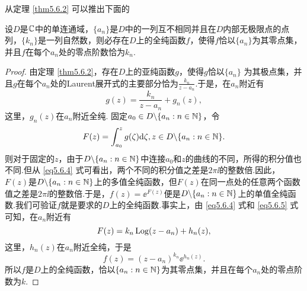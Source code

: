 从定理 \ref{thm5.6.2} 可以推出下面的
\begin{theorem}\label{thm5.6.3}
设$D$是$\mathbb C$中的单连通域，$\{a_n\}$是$D$中的一列互不相同并且在$D$内部无极限点的点列，$\{k_n\}$是一列自然数，则必存在$D$上的全纯函数$f$，使得$f$恰以$\{a_n\}$为其零点集，并且$f$在每个$a_n$处的零点阶数恰为$k_n$.
\end{theorem}
\begin{proof}
由定理 \ref{thm5.6.2}，存在$D$上的亚纯函数$g$，使得$g$恰以$\{a_n\}$
为其极点集，并且$g$在每个$a_n$处的Laurent展开式的主要部分恰为$\frac{k_n}{z-a_n}$.于是，在$a_n$附近有
\begin{equation}\label{eq5.6.4}
g(z)=\frac{k_n}{z-a_n}+g_n(z),
\end{equation}
这里，$g_n(z)$在$a_n$附近全纯. 固定$a_0\in D\backslash\{a_n:n\in\mathbb N\}$，令
\begin{equation}\label{eq5.6.5}
F(z)=\int_{a_0}^zg(\zeta)\textrm d\zeta,z\in D\backslash\{a_n:n\in\mathbb N\}.
\end{equation}
则对于固定的$z$，由于$D\backslash\{a_n:n\in\mathbb N\}$中连接$a_0$和$z$的曲线的不同，所得的积分值也不同.但从 \eqref{eq5.6.4} 式可看出，两个不同的积分值之差是$2\pi\ii$的整数倍.因此，$F(z)$是$D\backslash\{a_n:n\in\mathbb N\}$上的多值全纯函数，但$F(z)$在同一点处的任意两个函数值之差是$2\pi\ii$的整数倍.于是，$f(z)=\ee^{F(z)}$便是$D\backslash\{a_n:n\in\mathbb N\}$上的单值全纯函数.我们可验证$f$就是要求的$D$上的全纯函数.事实上，由 \eqref{eq5.6.4} 式和 \eqref{eq5.6.5} 式可知，在$a_n$附近有
\[F(z)=k_n\operatorname{Log}(z-a_n)+h_n(z),\]
这里，$h_n(z)$在$a_n$附近全纯，于是
\[f(z)=(z-a_n)^{k_n}\ee^{h_n(z)}.\]
所以$f$是$D$上的全纯函数，恰以$\{a_n:n\in\mathbb N\}$为其零点集，并且在每个$a_n$处的零点阶数为$k$.
\end{proof}


